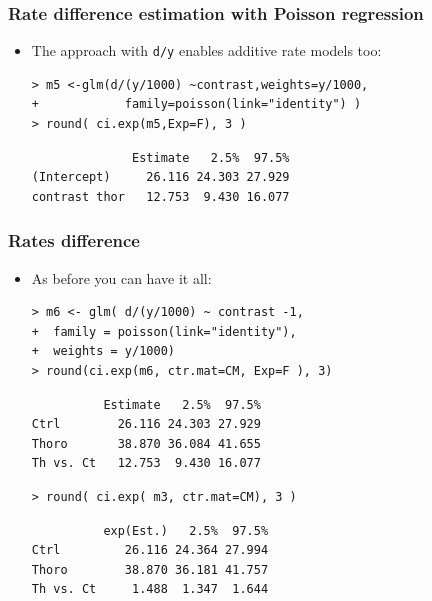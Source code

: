 \documentclass[handout,12pt,dvipsnames,t]{beamer}
\begin{document}
\begin{frame}[fragile]
\frametitle{Rate difference estimation with Poisson regression}

\begin{itemize}
\item The approach with \texttt{d/y} enables additive rate models too:
\lstset{basicstyle=\ttfamily\footnotesize}
\begin{lstlisting}
> m5 <-glm(d/(y/1000) ~contrast,weights=y/1000,
+            family=poisson(link="identity") )
> round( ci.exp(m5,Exp=F), 3 )
\end{lstlisting}
\begin{lstlisting}
              Estimate   2.5%  97.5%
(Intercept)     26.116 24.303 27.929
contrast thor   12.753  9.430 16.077
\end{lstlisting}
\end{itemize}
\end{frame}

\begin{frame}[fragile]
\frametitle{Rates difference}
\begin{itemize}
\item As before you can have it all:
\lstset{basicstyle=\ttfamily\footnotesize}
\begin{lstlisting}
> m6 <- glm( d/(y/1000) ~ contrast -1,
+  family = poisson(link="identity"), 
+  weights = y/1000)
> round(ci.exp(m6, ctr.mat=CM, Exp=F ), 3)
\end{lstlisting}
\begin{lstlisting}
          Estimate   2.5%  97.5%
Ctrl        26.116 24.303 27.929
Thoro       38.870 36.084 41.655
Th vs. Ct   12.753  9.430 16.077
\end{lstlisting}
\begin{lstlisting}
> round( ci.exp( m3, ctr.mat=CM), 3 )
\end{lstlisting}
\begin{lstlisting}
          exp(Est.)   2.5%  97.5%
Ctrl         26.116 24.364 27.994
Thoro        38.870 36.181 41.757
Th vs. Ct     1.488  1.347  1.644
\end{lstlisting}
\normalsize
\end{itemize}
\end{frame}
\end{document}
